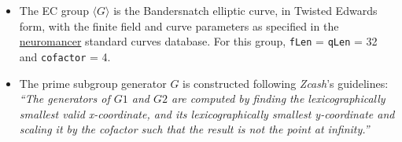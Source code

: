 \documentclass[
]{article}
\begin{document}
\begin{itemize}
\item
  The EC group \(\langle G \rangle\) is the Bandersnatch elliptic curve,
  in Twisted Edwards form, with the finite field and curve parameters as
  specified in the
  \href{https://neuromancer.sk/std/bls/Bandersnatch}{neuromancer}
  standard curves database. For this group, \texttt{fLen} =
  \texttt{qLen} = 32 and \texttt{cofactor} = 4.
\item
  The prime subgroup generator \(G\) is constructed following
  \emph{Zcash}'s guidelines: \emph{``The generators of \(G1\) and \(G2\)
  are computed by finding the lexicographically smallest valid
  x-coordinate, and its lexicographically smallest y-coordinate and
  scaling it by the cofactor such that the result is not the point at
  infinity.''}


\end{itemize}
\end{document}
